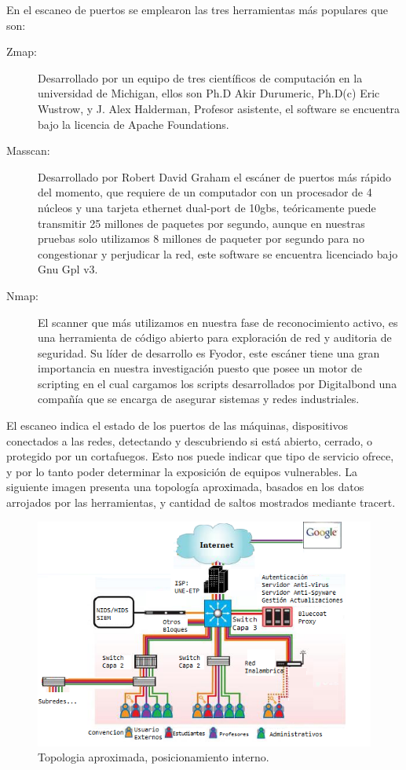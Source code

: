 \documentclass[jou,apacite]{apa6}
\begin{document}
En el escaneo de puertos se emplearon las tres herramientas más populares que son:
\begin{description}
\item [Zmap:] Desarrollado por un equipo de tres científicos de computación en la universidad de Michigan, ellos son Ph.D  Akir Durumeric, Ph.D(c) Eric Wustrow, y J. Alex Halderman, Profesor asistente, el software se encuentra bajo la licencia de Apache Foundations.
\item [Masscan:] Desarrollado por Robert David Graham el escáner de puertos más rápido del momento, que requiere de un computador con un procesador de 4 núcleos y una tarjeta ethernet dual-port de 10gbs, teóricamente puede transmitir 25 millones de paquetes por segundo, aunque en nuestras pruebas solo utilizamos 8 millones de paqueter por segundo para no congestionar y perjudicar la red, este software se encuentra licenciado bajo Gnu Gpl v3.
\item [Nmap:] El scanner que más utilizamos en nuestra fase de reconocimiento activo,  es una herramienta de código abierto para exploración de red y auditoria de seguridad. Su líder de desarrollo es Fyodor, este escáner tiene una gran importancia en nuestra investigación puesto que posee un motor de scripting en el cual cargamos los scripts desarrollados por Digitalbond una compañía que se encarga de asegurar sistemas y redes industriales.
\end{description}
El escaneo indica el estado de los puertos de las máquinas, dispositivos conectados a las redes, detectando y descubriendo si está abierto, cerrado, o protegido por un  cortafuegos. Esto nos puede indicar que tipo de servicio ofrece, y por lo tanto poder determinar la exposición de equipos vulnerables. La siguiente imagen presenta una topología aproximada, basados en los datos arrojados por las herramientas, y cantidad de saltos mostrados mediante tracert.
\begin{figure}[htb]
\centering
\includegraphics[scale=0.6]{images/f4topologia.png}
\caption{Topologia aproximada, posicionamiento interno.} \label{fig:topologiared}
\end{figure}
\end{document}
